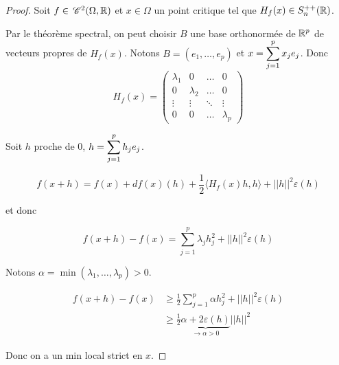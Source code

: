 \begin{proof}
    Soit $f \in \,\mathscr C^{2} (\Omega, \mathbb{R})$ et $x \in \Omega$ un point 
    critique tel que $H_f(x) \in S_n^{++}(\mathbb{R})$.

    Par le théorème spectral, on peut choisir $B$ une base orthonormée de $\mathbb{R}^p$
    de vecteurs propres de $H_f(x)$. Notons $B = (e_1, \ldots, e_p)$ et
    $x = \displaystyle \sum_{j = 1 }^{p } x_j e_j$.
    Donc 
    $$H_f(x) = \begin{pmatrix}
        \lambda_1 & 0 & \ldots & 0 \\
        0 & \lambda_2 & \ldots & 0 \\
        \vdots & \vdots & \ddots & \vdots \\
        0 & 0 & \ldots & \lambda_p
    \end{pmatrix}$$

    Soit $h$ proche de $0$, $h = \displaystyle \sum_{j = 1}^{p } h_j e_j$.

    $$f(x + h) = f(x) + df(x)(h) + \frac 1 2 \langle H_f(x) h, h \rangle + ||h||^2 \varepsilon(h)$$

    et donc 

    $$f(x + h) - f(x) = \sum_{j = 1}^{p } \lambda_j h_j^2 + ||h||^2 \varepsilon(h)$$


    Notons $\alpha = \min(\lambda_1, \ldots, \lambda_p) > 0$.

    \begin{align}
        f(x + h) - f(x) & \geqslant \frac 1 2 \sum_{j = 1 }^{p } \alpha h_j^2 + ||h||^2 \varepsilon(h) \\
        & \geqslant \frac 1 2 \underbrace{\alpha + 2 \varepsilon(h)}_{\to \alpha > 0} ||h||^2
    \end{align}

    Donc on a un min local strict en $x$.
\end{proof}

